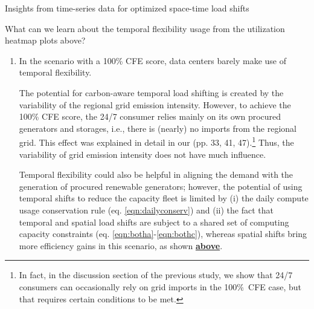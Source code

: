 \begin{frame}{Insights from time-series data for optimized space-time load shifts}

  {\footnotesize 

  What can we learn about the temporal flexibility usage from the utilization heatmap plots above?

  \begin{enumerate}

    \item In the scenario with a 100\% CFE score, data centers barely make use of temporal flexibility.

    \vspace{0.1cm}
    The potential for carbon-aware temporal load shifting is created by the variability of the regional grid emission intensity. However, to achieve the 100\% CFE score, the 24/7 consumer relies mainly on its own procured generators and storages, i.e., there is (nearly) no imports from the regional grid. This effect was explained in detail in our  (pp. 33, 41, 47).\footnote{\scriptsize{In fact, in the discussion section of the previous study, we show that 24/7 consumers can occasionally rely on grid imports in the 100\%~CFE case, but that requires certain conditions to be met.}} Thus, the variability of grid emission intensity does not have much influence.
    
    \vspace{0.1cm} Temporal flexibility could also be helpful in aligning the demand with the generation of procured renewable generators; however, the potential of using temporal shifts to reduce the capacity fleet is limited by (i) the daily compute usage conservation rule (eq. \ref{eqn:dailyconserv}) and (ii) the fact that temporal and spatial load shifts are subject to a shared set of computing capacity constraints (eq. \ref{eqn:botha}-\ref{eqn:bothc}), whereas spatial shifts bring more efficiency gains in this scenario, as shown {\bf \hyperlink{isolated-hook}{above}}.

  \end{enumerate}
  }
\end{frame}


